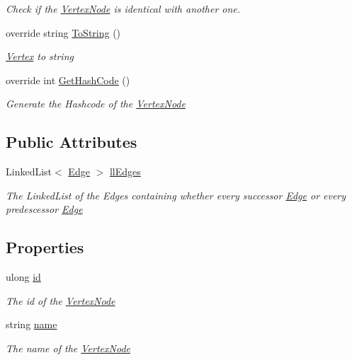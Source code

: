 \begin{DoxyCompactItemize}
\begin{DoxyCompactList}\small\item\em Check if the \hyperlink{classVertexNode}{Vertex\+Node} is identical with another one. \end{DoxyCompactList}\item 
override string \hyperlink{classVertexNode_ae13ff4301733e2cdc508cd9390958df9}{To\+String} ()
\begin{DoxyCompactList}\small\item\em \hyperlink{structVertex}{Vertex} to string \end{DoxyCompactList}\item 
override int \hyperlink{classVertexNode_aeab81fb11a36ce1f79d05a8cdac7c09a}{Get\+Hash\+Code} ()
\begin{DoxyCompactList}\small\item\em Generate the Hashcode of the \hyperlink{classVertexNode}{Vertex\+Node} \end{DoxyCompactList}\end{DoxyCompactItemize}
\subsection*{Public Attributes}
\begin{DoxyCompactItemize}
\item 
Linked\+List$<$ \hyperlink{classEdge}{Edge} $>$ \hyperlink{classVertexNode_aa7cfcf46801fc3960d3ca4d961427211}{ll\+Edges}
\begin{DoxyCompactList}\small\item\em The Linked\+List of the Edges containing whether every successor \hyperlink{classEdge}{Edge} or every predescessor \hyperlink{classEdge}{Edge}\end{DoxyCompactList}\end{DoxyCompactItemize}
\subsection*{Properties}
\begin{DoxyCompactItemize}
\item 
ulong \hyperlink{classVertexNode_ab185f268bff8c9339889c6f9954b3fa6}{id}
\begin{DoxyCompactList}\small\item\em The id of the \hyperlink{classVertexNode}{Vertex\+Node}\end{DoxyCompactList}\item 
string \hyperlink{classVertexNode_a91d893fb3f4cc68e17f1eb8d756245ab}{name}
\begin{DoxyCompactList}\small\item\em The name of the \hyperlink{classVertexNode}{Vertex\+Node}\end{DoxyCompactList}\end{DoxyCompactItemize}


